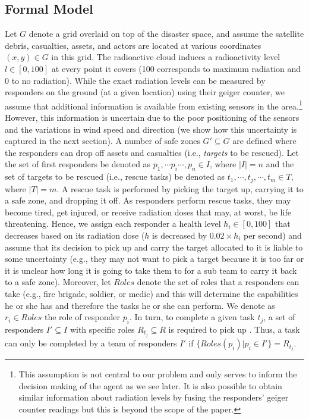 \subsection{Formal Model}
\noindent Let $G$ denote a grid overlaid on top of the disaster space, and assume the satellite debris, casualties, assets, and actors are located at various coordinates $(x,y) \in G$ in this grid. The radioactive cloud induces a radioactivity level  $l \in [0,100]$ at every point it covers (100 corresponds to maximum radiation and 0 to no radiation). While the exact radiation levels can be measured by responders on the ground (at a given location) using their geiger counter, we assume that additional information is available  from existing sensors  in the area.\footnote{This assumption is not central to our problem and only serves to inform the decision making of the agent as we see later. It is also possible to obtain similar information about radiation levels by fusing the responders' geiger counter readings but this is beyond the scope of the paper.} However, this information is uncertain due to the poor positioning of the sensors and the variations in wind speed and direction (we show how this uncertainty is captured in the next section). A number of safe zones $G' \subseteq G$ are defined where the responders can drop off assets and casualties (i.e., \emph{targets} to be rescued). Let the set of first responders be denoted as $p_1, \cdots p_i \cdots, p_n \in I$, where $|I| = n$ and the set of  targets to be rescued (i.e., rescue tasks) be denoted as  $t_1,\cdots, t_j, \cdots, t_m\in T$, where $|T| = m$. A rescue task is performed by picking the target up, carrying it to a safe zone, and dropping it off.  As responders perform rescue tasks, they may become tired, get injured, or receive radiation doses that may, at worst, be life threatening. Hence, we assign each responder  a health level $h_i\in [0,100]$ that decreases based on its radiation dose ($h$ is decreased by $0.02 \times h_i $ per second) and assume that its decision to pick up and carry the target allocated to it is liable to some uncertainty (e.g., they may not want to pick a target because it is too far or it is unclear how long it is going to take them to for a sub team to carry it back  to a safe zone).  Moreover, let $Roles$ denote the set of roles that a responders can take (e.g., fire brigade, soldier, or medic)  and this will determine the capabilities he or she has and therefore the tasks he or she can perform. We denote as $r_i \in Roles$ the role of responder $p_i$. In turn, to complete a given task $t_j$,  a set of responders $I' \subseteq I$ with specific roles $R_{t_j} \subseteq R$ is required to pick up . Thus, a task can only be completed by a team of responders $I'$ if $\{Roles(p_i) | p_i \in I'\} = R_{t_j}$.
%
